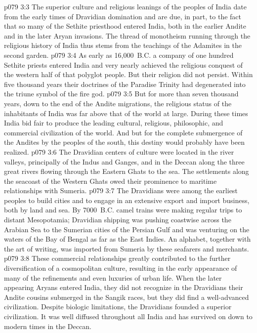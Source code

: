 \pc \vs p079 3:3 The superior culture and religious leanings of the peoples of India date from the early times of Dravidian domination and are due, in part, to the fact that so many of the Sethite priesthood entered India, both in the earlier Andite and in the later Aryan invasions. The thread of monotheism running through the religious history of India thus stems from the teachings of the Adamites in the second garden.
\vs p079 3:4 As early as 16,000~B.C. a company of one hundred Sethite priests entered India and very nearly achieved the religious conquest of the western half of that polyglot people. But their religion did not persist. Within five thousand years their doctrines of the Paradise Trinity had degenerated into the triune symbol of the fire god.
\vs p079 3:5 But for more than seven thousand years, down to the end of the Andite migrations, the religious status of the inhabitants of India was far above that of the world at large. During these times India bid fair to produce the leading cultural, religious, philosophic, and commercial civilization of the world. And but for the complete submergence of the Andites by the peoples of the south, this destiny would probably have been realized.
\pc \vs p079 3:6 The Dravidian centers of culture were located in the river valleys, principally of the Indus and Ganges, and in the Deccan along the three great rivers flowing through the Eastern Ghats to the sea. The settlements along the seacoast of the Western Ghats owed their prominence to maritime relationships with Sumeria.
\vs p079 3:7 The Dravidians were among the earliest peoples to build cities and to engage in an extensive export and import business, both by land and sea. By 7000~B.C. camel trains were making regular trips to distant Mesopotamia; Dravidian shipping was pushing coastwise across the Arabian Sea to the Sumerian cities of the Persian Gulf and was venturing on the waters of the Bay of Bengal as far as the East Indies. An alphabet, together with the art of writing, was imported from Sumeria by these seafarers and merchants.\plusone
\vs p079 3:8 These commercial relationships greatly contributed to the further diversification of a cosmopolitan culture, resulting in the early appearance of many of the refinements and even luxuries of urban life. When the later appearing Aryans entered India, they did not recognize in the Dravidians their Andite cousins submerged in the Sangik races, but they did find a well\hyp{}advanced civilization. Despite biologic limitations, the Dravidians founded a superior civilization. It was well diffused throughout all India and has survived on down to modern times in the Deccan.
